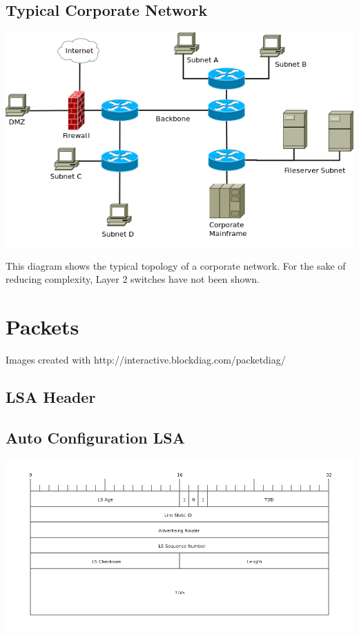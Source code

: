\begin{landscape}
\chapter{Typical Corporate Network}
\label{typical_corporate_net}
\begin{center}
	\includegraphics[width=0.75\linewidth]{../Diagrams/Network/CorporateNetwork.png}
\end{center}
This diagram shows the typical topology of a corporate network. For the sake of reducing complexity, Layer 2 switches have not been shown.

\end{landscape}

\chapter{Packets}
Images created with http://interactive.blockdiag.com/packetdiag/

\section{LSA Header}
\label{LSA-HEADER}

\section{Auto Configuration LSA}
\label{AC-LSA}
\begin{center}
	\includegraphics[width=\linewidth]{../Diagrams/Packets/ac_lsa.png}
\end{center}

